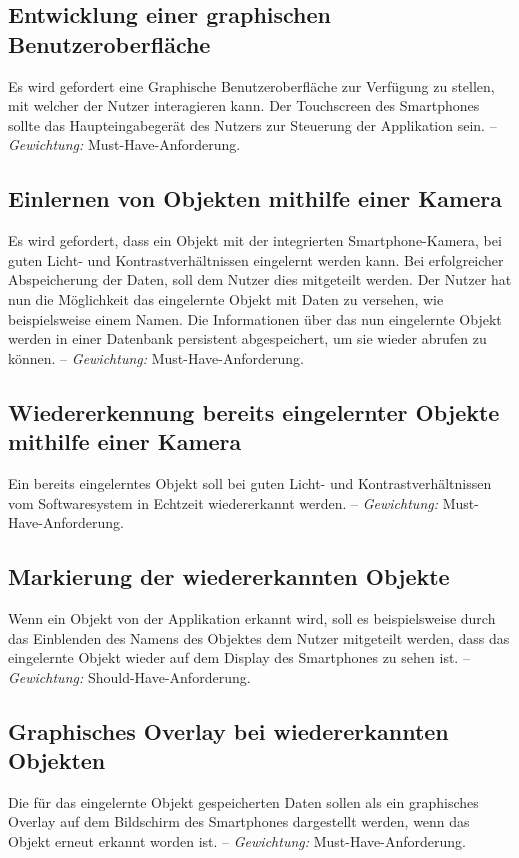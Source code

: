\documentclass[oneside]{ausarbeitung}
\begin{document}
\subsection{Entwicklung einer graphischen Benutzeroberfläche}
Es wird gefordert eine Graphische Benutzeroberfläche zur Verfügung zu stellen, mit welcher der Nutzer interagieren kann. Der Touchscreen des Smartphones sollte das Haupteingabegerät des Nutzers zur Steuerung der Applikation sein. -- \textit{Gewichtung:} Must-Have-Anforderung.
\subsection{Einlernen von Objekten mithilfe einer Kamera}
Es wird gefordert, dass ein Objekt mit der integrierten Smartphone-Kamera, bei guten Licht- und Kontrastverhältnissen eingelernt werden kann. Bei erfolgreicher Abspeicherung der Daten, soll dem Nutzer dies mitgeteilt werden. Der Nutzer hat nun die Möglichkeit das eingelernte Objekt mit Daten zu versehen, wie beispielsweise einem Namen. Die Informationen über das nun eingelernte Objekt werden in einer Datenbank persistent abgespeichert, um sie wieder abrufen zu können. -- \textit{Gewichtung:} Must-Have-Anforderung.

\subsection{Wiedererkennung bereits eingelernter Objekte mithilfe einer Kamera}
Ein bereits eingelerntes Objekt soll bei guten Licht- und Kontrastverhältnissen vom Softwaresystem in Echtzeit wiedererkannt werden. -- \textit{Gewichtung:} Must-Have-Anforderung.

\subsection{Markierung der wiedererkannten Objekte}
Wenn ein Objekt von der Applikation erkannt wird, soll es beispielsweise durch das Einblenden des Namens des Objektes dem Nutzer mitgeteilt werden, dass das eingelernte Objekt wieder auf dem Display des Smartphones zu sehen ist. -- \textit{Gewichtung:} Should-Have-Anforderung.
\subsection{Graphisches Overlay bei wiedererkannten Objekten}
Die für das eingelernte Objekt gespeicherten Daten sollen als ein graphisches Overlay auf dem Bildschirm des Smartphones dargestellt werden, wenn das Objekt erneut erkannt worden ist. -- \textit{Gewichtung:} Must-Have-Anforderung.
\end{document}
